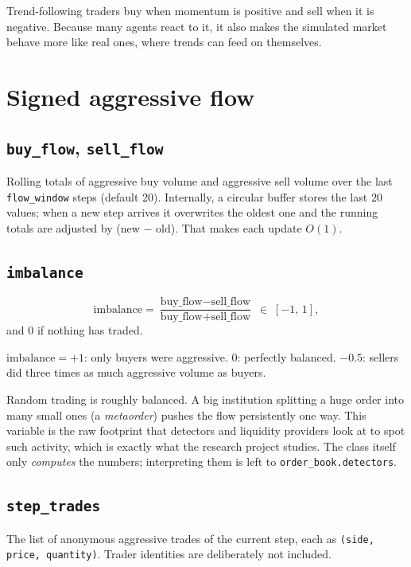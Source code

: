 \documentclass[11pt,a4paper]{article}
\newcommand{\code}[1]{\texttt{#1}}
\begin{document}
\begin{whyuse}
Trend-following traders buy when momentum is positive and sell when it is negative. Because many
agents react to it, it also makes the simulated market behave more like real ones, where trends can
feed on themselves.
\end{whyuse}

\section{Signed aggressive flow}

\subsection{\code{buy\_flow}, \code{sell\_flow}}
Rolling totals of aggressive buy volume and aggressive sell volume over the last \code{flow\_window}
steps (default 20). Internally, a circular buffer stores the last 20 values; when a new step arrives
it overwrites the oldest one and the running totals are adjusted by (new $-$ old). That makes each
update $O(1)$.

\subsection{\code{imbalance}}
\[
  \text{imbalance} = \frac{\text{buy\_flow} - \text{sell\_flow}}{\text{buy\_flow} + \text{sell\_flow}}
  \;\in\;[-1,\,1],
\]
and $0$ if nothing has traded.

\begin{example}
$\text{imbalance}=+1$: only buyers were aggressive. $0$: perfectly balanced. $-0.5$: sellers did
three times as much aggressive volume as buyers.
\end{example}

\begin{whyuse}
Random trading is roughly balanced. A big institution splitting a huge order into many small ones
(a \emph{metaorder}) pushes the flow persistently one way. This variable is the raw footprint that
detectors and liquidity providers look at to spot such activity, which is exactly what the research
project studies. The class itself only \emph{computes} the numbers; interpreting them is left to
\code{order\_book.detectors}.
\end{whyuse}

\subsection{\code{step\_trades}}
The list of anonymous aggressive trades of the current step, each as
\code{(side, price, quantity)}. Trader identities are deliberately not included.
\end{document}
